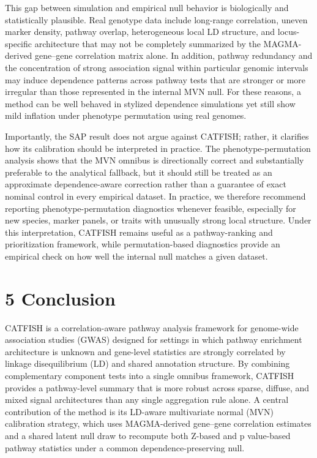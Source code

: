 \documentclass[unnumsec,webpdf,contemporary,large]{oup-authoring-template}%
\theoremstyle{thmstyleone}%
\theoremstyle{thmstyletwo}%
\theoremstyle{thmstylethree}%
\begin{document}
This gap between simulation and empirical null behavior is biologically and statistically plausible. Real genotype data include long-range correlation, uneven marker density, pathway overlap, heterogeneous local LD structure, and locus-specific architecture that may not be completely summarized by the MAGMA-derived gene--gene correlation matrix alone. In addition, pathway redundancy and the concentration of strong association signal within particular genomic intervals may induce dependence patterns across pathway tests that are stronger or more irregular than those represented in the internal MVN null. For these reasons, a method can be well behaved in stylized dependence simulations yet still show mild inflation under phenotype permutation using real genomes.

Importantly, the SAP result does not argue against CATFISH; rather, it clarifies how its calibration should be interpreted in practice. The phenotype-permutation analysis shows that the MVN omnibus is directionally correct and substantially preferable to the analytical fallback, but it should still be treated as an approximate dependence-aware correction rather than a guarantee of exact nominal control in every empirical dataset. In practice, we therefore recommend reporting phenotype-permutation diagnostics whenever feasible, especially for new species, marker panels, or traits with unusually strong local structure. Under this interpretation, CATFISH remains useful as a pathway-ranking and prioritization framework, while permutation-based diagnostics provide an empirical check on how well the internal null matches a given dataset.

\section{5 Conclusion}

CATFISH is a correlation-aware pathway analysis framework for genome-wide association studies (GWAS) designed for settings in which pathway enrichment architecture is unknown and gene-level statistics are strongly correlated by linkage disequilibrium (LD) and shared annotation structure. By combining complementary component tests into a single omnibus framework, CATFISH provides a pathway-level summary that is more robust across sparse, diffuse, and mixed signal architectures than any single aggregation rule alone. A central contribution of the method is its LD-aware multivariate normal (MVN) calibration strategy, which uses MAGMA-derived gene--gene correlation estimates and a shared latent null draw to recompute both Z-based and p value-based pathway statistics under a common dependence-preserving null.
\end{document}
